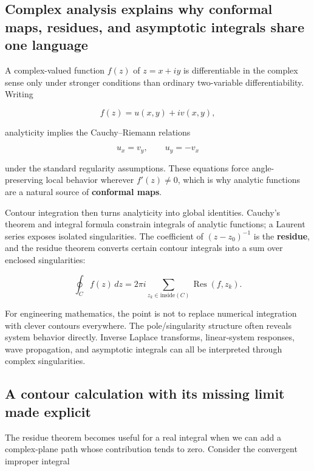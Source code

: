\subsection{Complex analysis explains why conformal maps, residues, and asymptotic integrals share one language}\label{02-foundations-ii-ch025-complex-analysis-explains-why-conformal-maps-residues-and-asymptotic-integrals-share-one-language}

A complex-valued function \(f(z)\) of \(z=x+iy\) is differentiable in the complex sense only under stronger conditions than ordinary two-variable differentiability. Writing

\[
f(z)=u(x,y)+iv(x,y),
\]

analyticity implies the Cauchy--Riemann relations

\[
u_x=v_y,\qquad u_y=-v_x
\]

under the standard regularity assumptions. These equations force angle-preserving local behavior wherever \(f'(z)\neq0\), which is why analytic functions are a natural source of \textbf{conformal maps}.

Contour integration then turns analyticity into global identities. Cauchy's theorem and integral formula constrain integrals of analytic functions; a Laurent series exposes isolated singularities. The coefficient of \((z-z_0)^{-1}\) is the \textbf{residue}, and the residue theorem converts certain contour integrals into a sum over enclosed singularities:

\[
\oint_C f(z)\,dz
=
2\pi i
\sum_{z_k\in\mathrm{inside}(C)}
\operatorname{Res}(f,z_k).
\]

For engineering mathematics, the point is not to replace numerical integration with clever contours everywhere. The pole/singularity structure often reveals system behavior directly. Inverse Laplace transforms, linear-system responses, wave propagation, and asymptotic integrals can all be interpreted through complex singularities.

\subsection{A contour calculation with its missing limit made explicit}\label{02-foundations-ii-ch025-a-contour-calculation-with-its-missing-limit-made-explicit}

The residue theorem becomes useful for a real integral when we can add a complex-plane path whose contribution tends to zero. Consider the convergent improper integral

